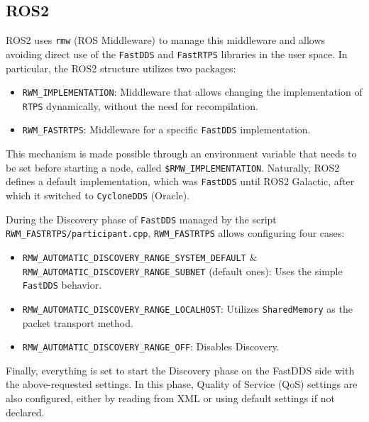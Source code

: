 \subsection{ROS2}
ROS2 uses \texttt{rmw} (ROS Middleware) to manage this middleware and allows avoiding direct use of the \texttt{FastDDS} and \texttt{FastRTPS} libraries in the user space. In particular, the ROS2 structure utilizes two packages:

\begin{itemize}
    \item \texttt{RWM\_IMPLEMENTATION}: Middleware that allows changing the implementation of \texttt{RTPS} dynamically, without the need for recompilation.
    \item \texttt{RWM\_FASTRTPS}: Middleware for a specific \texttt{FastDDS} implementation.
\end{itemize}

This mechanism is made possible through an environment variable that needs to be set before starting a node, called \texttt{\$RMW\_IMPLEMENTATION}. Naturally, ROS2 defines a default implementation, which was \texttt{FastDDS} until ROS2 Galactic, after which it switched to \texttt{CycloneDDS} (Oracle).

During the Discovery phase of \texttt{FastDDS} managed by the script \texttt{RWM\_FASTRTPS/participant.cpp}, \texttt{RWM\_FASTRTPS} allows configuring four cases:

\begin{itemize}
    \item \texttt{RMW\_AUTOMATIC\_DISCOVERY\_RANGE\_SYSTEM\_DEFAULT} \& \texttt{RMW\_AUTOMATIC\_DISCOVERY\_RANGE\_SUBNET} (default ones): Uses the simple \texttt{FastDDS} behavior.
    \item \texttt{RMW\_AUTOMATIC\_DISCOVERY\_RANGE\_LOCALHOST}: Utilizes \texttt{SharedMemory} as the packet transport method.
    \item \texttt{RMW\_AUTOMATIC\_DISCOVERY\_RANGE\_OFF}: Disables Discovery.
\end{itemize}

Finally, everything is set to start the Discovery phase on the FastDDS side with the above-requested settings. In this phase, Quality of Service (QoS) settings are also configured, either by reading from XML or using default settings if not declared.


